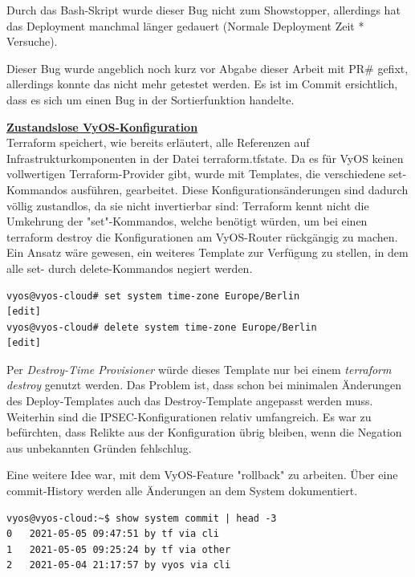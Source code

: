 Durch das Bash-Skript wurde dieser Bug nicht zum Showstopper, allerdings hat das Deployment manchmal länger gedauert (Normale Deployment Zeit * Versuche).

Dieser Bug wurde angeblich noch kurz vor Abgabe dieser Arbeit mit PR\# gefixt, allerdings konnte das nicht mehr getestet werden. Es ist im Commit ersichtlich, dass es sich um einen Bug in der Sortierfunktion handelte.

\textbf{\underline{Zustandslose VyOS-Konfiguration}}\\
Terraform speichert, wie bereits erläutert, alle Referenzen auf Infrastrukturkomponenten in der Datei terraform.tfstate. Da es für VyOS keinen vollwertigen Terraform-Provider gibt, wurde mit Templates, die verschiedene set-Kommandos ausführen, gearbeitet. Diese Konfigurationsänderungen sind dadurch völlig zustandlos, da sie nicht invertierbar sind: Terraform kennt nicht die Umkehrung der "set"-Kommandos, welche benötigt würden, um bei einen \glqq terraform destroy\grqq{} die Konfigurationen am VyOS-Router rückgängig zu machen.
Ein Ansatz wäre gewesen, ein weiteres Template zur Verfügung zu stellen, in dem alle set- durch delete-Kommandos negiert werden.\\
\begin{lstlisting}[label=set-delete-vyos,caption=delete negiert das vorherige set-Kommando.]
vyos@vyos-cloud# set system time-zone Europe/Berlin
[edit]
vyos@vyos-cloud# delete system time-zone Europe/Berlin
[edit]
\end{lstlisting}
Per \textit{Destroy-Time Provisioner} würde dieses Template nur bei einem \textit{terraform destroy} genutzt werden. Das Problem ist, dass schon bei minimalen Änderungen des Deploy-Templates auch das Destroy-Template angepasst werden muss. Weiterhin sind die IPSEC-Konfigurationen relativ umfangreich. Es war zu befürchten, dass Relikte aus der Konfiguration übrig bleiben, wenn die Negation aus unbekannten Gründen fehlschlug.

Eine weitere Idee war, mit dem VyOS-Feature "rollback" zu arbeiten. Über eine commit-History werden alle Änderungen an dem System dokumentiert.
\begin{lstlisting}[label=commit-history-vyos,caption=Commit History VyOS]
vyos@vyos-cloud:~$ show system commit | head -3
0   2021-05-05 09:47:51 by tf via cli
1   2021-05-05 09:25:24 by tf via other
2   2021-05-04 21:17:57 by vyos via cli
\end{lstlisting}

